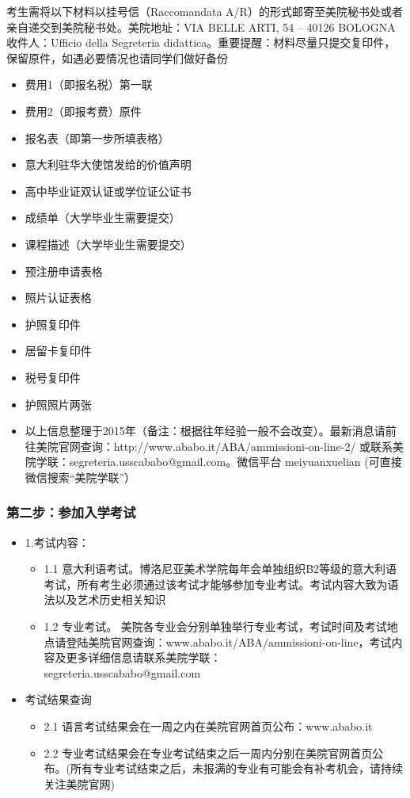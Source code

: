 \documentclass[3pt,a5paper,openright,twoside]{book}
\begin{document}
考生需将以下材料以挂号信（Raccomandata A/R）的形式邮寄至美院秘书处或者亲自递交到美院秘书处。美院地址：VIA BELLE ARTI, 54 – 40126 BOLOGNA 收件人：Ufficio della Segreteria didattica。重要提醒：材料尽量只提交复印件，保留原件，如遇必要情况也请同学们做好备份
\begin{itemize}
    \item  费用1（即报名税）第一联
    \item  费用2（即报考费）原件
    \item  报名表（即第一步所填表格）
    \item  意大利驻华大使馆发给的价值声明
    \item  高中毕业证双认证或学位证公证书
    \item  成绩单（大学毕业生需要提交）
    \item  课程描述（大学毕业生需要提交）
    \item  预注册申请表格
    \item  照片认证表格
    \item  护照复印件
    \item  居留卡复印件
    \item  税号复印件
    \item  护照照片两张
    \item  以上信息整理于2015年（备注：根据往年经验一般不会改变）。最新消息请前往美院官网查询：http://www.ababo.it/ABA/ammissioni-on-line-2/ 或联系美院学联：segreteria.usscababo@gmail.com。微信平台  meiyuanxuelian (可直接微信搜索“美院学联”）
\end{itemize}

\subsubsection{第二步：参加入学考试}
\begin{itemize}
  \item  1.考试内容：
    \begin{itemize}
      \item  1.1 意大利语考试。博洛尼亚美术学院每年会单独组织B2等级的意大利语考试，所有考生必须通过该考试才能够参加专业考试。考试内容大致为语法以及艺术历史相关知识
      \item  1.2 专业考试。 美院各专业会分别单独举行专业考试，考试时间及考试地点请登陆美院官网查询：www.ababo.it/ABA/ammissioni-on-line，考试内容及更多详细信息请联系美院学联：\\
      segreteria.usscababo@gmail.com
    \end{itemize}
  \item  考试结果查询
     \begin{itemize}
      \item  2.1 语言考试结果会在一周之内在美院官网首页公布：www.ababo.it
      \item  2.2 专业考试结果会在专业考试结束之后一周内分别在美院官网首页公布。(所有专业考试结束之后，未报满的专业有可能会有补考机会，请持续关注美院官网)
    \end{itemize}
 \end{itemize}
\end{document}
